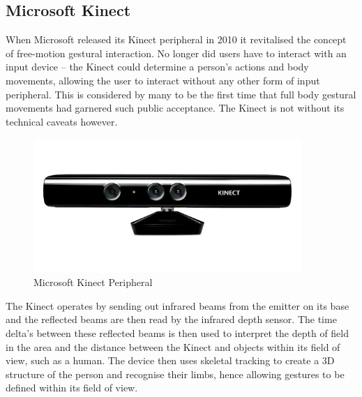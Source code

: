\documentclass{l4proj}
\begin{document}
\subsection{Microsoft Kinect}
\vspace{-3mm}
When Microsoft released its Kinect peripheral in 2010 it revitalised the concept of free-motion gestural interaction. No longer did users have to interact with an input device -- the Kinect could determine a person's actions and body movements, allowing the user to interact without any other form of input peripheral. This is considered by many to be the first time that full body gestural movements had garnered such public acceptance. The Kinect is not without its technical caveats however.
\begin{figure}[h!]
\centering
\includegraphics[width=4in]{images/kinect.jpg}
\caption{Microsoft Kinect Peripheral}
\label{fig:kinect}
\end{figure}

The Kinect operates by sending out infrared beams from the emitter on its base and the reflected beams are then read by the infrared depth sensor. The time delta’s between these reflected beams is then used to interpret the depth of field in the area and the distance between the Kinect and objects within its field of view, such as a human. The device then uses skeletal tracking to create a 3D structure of the person and recognise their limbs, hence allowing gestures to be defined within its field of view.
\end{document}
